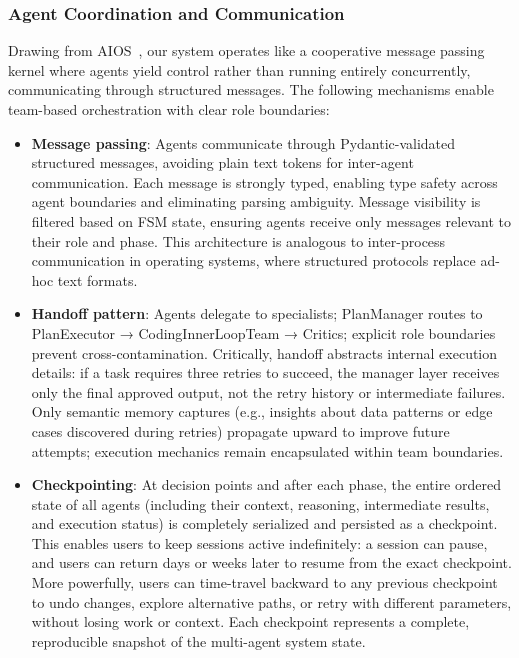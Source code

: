 \documentclass[sigconf]{acmart}
\begin{document}
\subsubsection{Agent Coordination and Communication}

Drawing from AIOS~\cite{Mei2024AIOS}, our system operates like a cooperative message passing kernel where agents yield control rather than running entirely concurrently, communicating through structured messages. The following mechanisms enable team-based orchestration with clear role boundaries:

\begin{itemize}
  \item \textbf{Message passing}: Agents communicate through Pydantic-validated structured messages, avoiding plain text tokens for inter-agent communication. Each message is strongly typed, enabling type safety across agent boundaries and eliminating parsing ambiguity. Message visibility is filtered based on FSM state, ensuring agents receive only messages relevant to their role and phase. This architecture is analogous to inter-process communication in operating systems, where structured protocols replace ad-hoc text formats.
  \item \textbf{Handoff pattern}: Agents delegate to specialists; PlanManager routes to PlanExecutor → CodingInnerLoopTeam → Critics; explicit role boundaries prevent cross-contamination. Critically, handoff abstracts internal execution details: if a task requires three retries to succeed, the manager layer receives only the final approved output, not the retry history or intermediate failures. Only semantic memory captures (e.g., insights about data patterns or edge cases discovered during retries) propagate upward to improve future attempts; execution mechanics remain encapsulated within team boundaries.
  \item \textbf{Checkpointing}: At decision points and after each phase, the entire ordered state of all agents (including their context, reasoning, intermediate results, and execution status) is completely serialized and persisted as a checkpoint. This enables users to keep sessions active indefinitely: a session can pause, and users can return days or weeks later to resume from the exact checkpoint. More powerfully, users can time-travel backward to any previous checkpoint to undo changes, explore alternative paths, or retry with different parameters, without losing work or context. Each checkpoint represents a complete, reproducible snapshot of the multi-agent system state.

\end{itemize}
\end{document}
